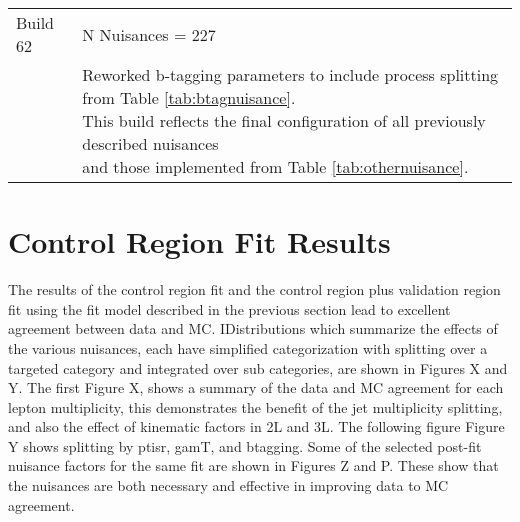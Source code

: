 \begin{table}
\begin{tabular}{ll}
 & \\
\hline 
Build 62 & N Nuisances = 227 \\
\hline
 & \makecell[l]{Reworked b-tagging parameters to include process splitting from Table \ref{tab:btagnuisance}. \\ This build reflects the final configuration of all previously described nuisances \\ and those implemented from Table \ref{tab:othernuisance}. } \\
\end{tabular} 
\label{tab:builds}
\end{table}
\section{Control Region Fit Results}
The results of the control region fit and the control region plus validation region fit using the fit model described in the previous section lead to excellent agreement between data and MC. IDistributions which summarize the effects of the various nuisances, each have simplified categorization with splitting over a targeted category and integrated over sub categories, are shown in Figures X and Y. The first Figure X, shows a summary of the data and MC agreement for each lepton multiplicity, this demonstrates the benefit of the jet multiplicity splitting, and also the effect of kinematic factors in 2L and 3L. The following figure Figure Y shows splitting by ptisr, gamT, and btagging. Some of the selected post-fit nuisance factors for the same fit are shown in Figures Z and P. These show that the nuisances are both necessary and effective in improving data to MC agreement.



